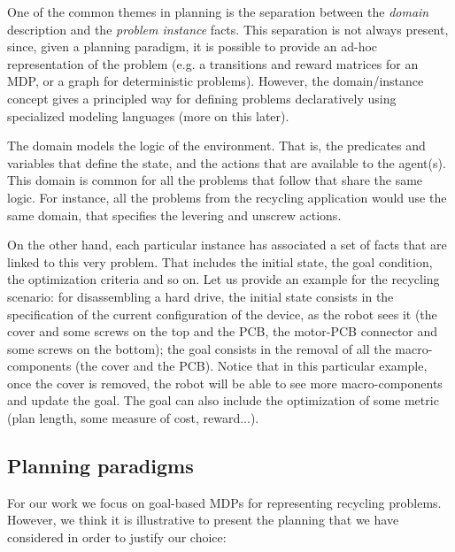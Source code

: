 \documentclass[../root.tex]{subfiles}
\begin{document}
One of the common themes in planning is the separation between the \emph{domain}
description and the \emph{problem instance} facts.
This separation is not always present,
since, given a planning paradigm, it is possible to provide an ad-hoc
representation of the problem (e.g. a transitions and reward matrices for an
MDP, or a graph for deterministic problems).
However, the domain/instance concept gives a principled way for defining
problems declaratively
using specialized modeling languages (more on this later).

The domain models the logic of the environment. That is, the predicates
and variables that define the state, and the actions that are available
to the agent(s). This domain is common for all the problems that follow
that share the same logic. For instance, all the problems from the
recycling application would use the same domain, that specifies the
levering and unscrew actions.

On the other hand, each particular instance has associated a set of
facts that are linked to this very problem. That includes the initial state,
the goal condition, the optimization criteria and so on. Let us provide
an example for the recycling scenario: for disassembling a hard drive,
the initial state consists in the specification of the current configuration
of the device, as the robot sees it (the cover and some screws on the top and
the PCB, the motor-PCB connector and some screws on the bottom); the goal
consists in the removal of all the macro-components (the cover and the PCB).
Notice that in this particular example, once the cover is removed, the robot will
be able to see more macro-components and update the goal. The goal can also
include the optimization of some metric (plan length, some measure of cost,
reward...).

\subsection{Planning paradigms}

For our work we focus on goal-based MDPs for representing recycling
problems. However, we think it is illustrative to present the planning
that we have considered in order to justify our choice:
\end{document}
